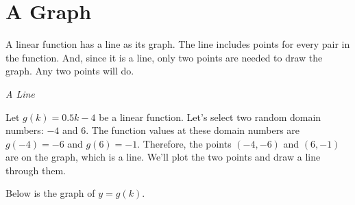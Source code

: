 \documentclass{ximera}
\begin{document}
\section{A Graph}




A linear function has a line as its graph.  The line includes points for every pair in the function.  And, since it is a line, only two points are needed to draw the graph.  Any two points will do.





\begin{example} \textit{A Line}


Let $g(k) = 0.5k - 4$ be a linear function.  Let's select two random domain numbers: $-4$ and $6$.  The function values at these domain numbers are $g(-4) = -6$ and $g(6) = -1$.  Therefore, the points $(-4, -6)$ and $(6, -1)$ are on the graph, which is a line.  We'll plot the two points and draw a line through them.


Below is the graph of $y=g(k)$.


\begin{image}
\end{image}



\end{example}
\end{document}
